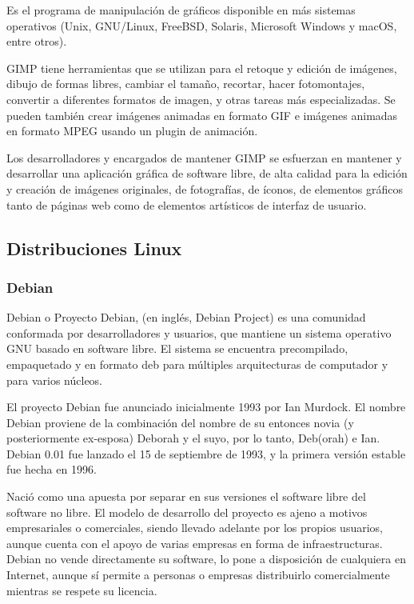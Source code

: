Es el programa de manipulación de gráficos disponible en más sistemas operativos (Unix, GNU/Linux, FreeBSD, Solaris, Microsoft Windows y macOS, entre otros).

GIMP tiene herramientas que se utilizan para el retoque y edición de imágenes, dibujo de formas libres, cambiar el tamaño, recortar, hacer fotomontajes, convertir a diferentes formatos de imagen, y otras tareas más especializadas. Se pueden también crear imágenes animadas en formato GIF e imágenes animadas en formato MPEG usando un plugin de animación.

Los desarrolladores y encargados de mantener GIMP se esfuerzan en mantener y desarrollar una aplicación gráfica de software libre, de alta calidad para la edición y creación de imágenes originales, de fotografías, de íconos, de elementos gráficos tanto de páginas web como de elementos artísticos de interfaz de usuario.

\subsection{Distribuciones Linux}

\subsubsection{Debian}
Debian o Proyecto Debian, (en inglés, Debian Project) es una comunidad conformada por desarrolladores y usuarios, que mantiene un sistema operativo GNU basado en software libre. El sistema se encuentra precompilado, empaquetado y en formato deb para múltiples arquitecturas de computador y para varios núcleos.

El proyecto Debian fue anunciado inicialmente 1993 por Ian Murdock. El nombre Debian proviene de la combinación del nombre de su entonces novia (y posteriormente ex-esposa) Deborah y el suyo, por lo tanto, Deb(orah) e Ian. Debian 0.01 fue lanzado el 15 de septiembre de 1993, y la primera versión estable fue hecha en 1996.

Nació como una apuesta por separar en sus versiones el software libre del software no libre. El modelo de desarrollo del proyecto es ajeno a motivos empresariales o comerciales, siendo llevado adelante por los propios usuarios, aunque cuenta con el apoyo de varias empresas en forma de infraestructuras. Debian no vende directamente su software, lo pone a disposición de cualquiera en Internet, aunque sí permite a personas o empresas distribuirlo comercialmente mientras se respete su licencia.

